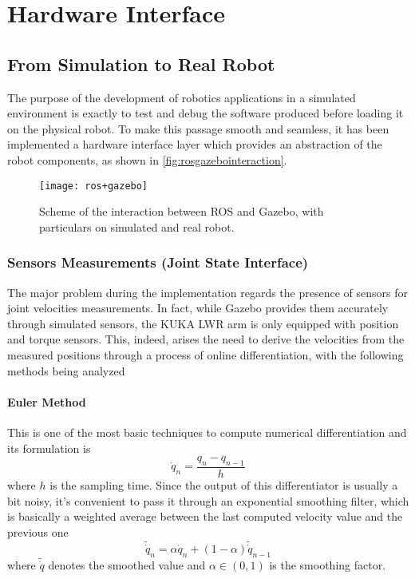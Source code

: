 \section{Hardware Interface}
\subsection{From Simulation to Real Robot}
The purpose of the development of robotics applications in a simulated environment is exactly to test and debug the software produced before loading it on the physical robot. To make this passage smooth and seamless, it has been implemented a hardware interface layer which provides an abstraction of the robot components, as shown in \autoref{fig:rosgazebointeraction}.
\begin{figure}[H]
\centerline{\texttt{[image: ros+gazebo]}}
\caption[Scheme of the interaction between ROS and Gazebo.]{Scheme of the interaction between ROS and Gazebo, with particulars on simulated and real robot.}
\label{fig:rosgazebointeraction}
\end{figure}
\subsubsection{Sensors Measurements (Joint State Interface)}
The major problem during the implementation regards the presence of sensors for joint velocities measurements. In fact, while Gazebo provides them accurately through simulated sensors, the KUKA LWR arm is only equipped with position and torque sensors. This, indeed, arises the need to derive the velocities from the measured positions through a process of online differentiation, with the following methods being analyzed
\paragraph{Euler Method}
This is one of the most basic techniques to compute numerical differentiation and its formulation is
\begin{equation}
\dot{q}_n = \frac{q_n - q_{n-1}}{h}
\end{equation}
where $h$ is the sampling time. Since the output of this differentiator is usually a bit noisy, it's convenient to pass it through an exponential smoothing filter, which is basically a weighted average between the last computed velocity value and the previous one
\begin{equation}
\tilde{\dot{q}}_n = \alpha\dot{q}_n + (1-\alpha)\tilde{\dot{q}}_{n-1} 
\end{equation}
where $\tilde{\dot{q}}$ denotes the smoothed value and $\alpha\in(0,1)$ is the smoothing factor.
